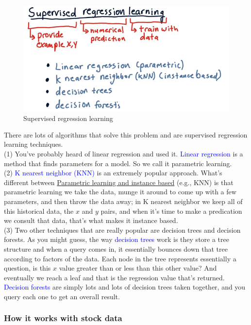 \documentclass[12pt]{article}
\begin{document}
\begin{figure}[!ht]
\centering
\includegraphics[scale=0.45]{fig/fig72}
\caption{Supervised regression learning}
\end{figure}

There are lots of algorithms that solve this problem and are supervised regression learning techniques. \\
(1) You've probably heard of linear regression and used it. \textcolor{blue}{Linear regression} is a method that finds parameters for a model. So we call it parametric learning. \\[8pt]
(2) \textcolor{blue}{K nearest neighbor (KNN)} is an extremely popular approach. What's different between \underline{Parametric learning and instance based} (e.g., KNN) is that parametric learning we take the data, munge it around to come up with a few parameters, and then throw the data away; in K nearest neighbor we keep all of this historical data, the $x$ and $y$ pairs, and when it's time to make a predication we consult that data, that's what makes it instance based. \\[8pt]
(3) Two other techniques that are really popular are decision trees and decision forests. As you might guess, the way \textcolor{blue}{decision trees} work is they store a tree structure and when a query comes in, it essentially bounces down that tree according to factors of the data. Each node in the tree represents essentially a question, is this $x$ value greater than or less than this other value? And eventually we reach a leaf and that is the regression value that's returned. \textcolor{blue}{Decision forests} are simply lots and lots of decision trees taken together, and you query each one to get an overall result. 

\subsubsection{How it works with stock data}
\end{document}
